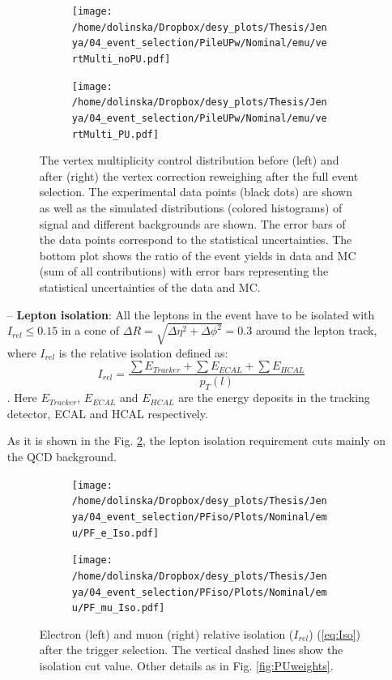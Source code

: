 \begin{itemize}
 \begin{figure}[h]
 \centering
 \begin{subfigure}
   \centering
   \texttt{[image: /home/dolinska/Dropbox/desy\_plots/Thesis/Jenya/04\_event\_selection/PileUPw/Nominal/emu/vertMulti\_noPU.pdf]}
 \end{subfigure}
 \begin{subfigure}
   \centering
   \texttt{[image: /home/dolinska/Dropbox/desy\_plots/Thesis/Jenya/04\_event\_selection/PileUPw/Nominal/emu/vertMulti\_PU.pdf]}
 \end{subfigure}
 \caption{The vertex multiplicity control distribution before (left) and after (right) the vertex correction reweighing after the full event selection.
  The experimental data points (black dots) are shown as well as the simulated distributions (colored histograms) of signal and different backgrounds 
  are shown. The error bars of the data points correspond to the statistical uncertainties. The bottom plot shows the ratio of the event yields in data 
  and MC (sum of all contributions) with error bars representing the statistical uncertainties of the data and MC.}
 \label{fig:PUweight}
 \end{figure}
 
 \item [--] \textbf{Lepton isolation}: All the leptons in the event have to be isolated with $I_{rel}\leq 0.15$ in a cone of $\Delta R = \sqrt{\Delta\eta^{2} + \Delta\phi^{2}} = 0.3$ 
 around the lepton track, where $I_{rel}$ is the relative isolation defined as:
  \begin{equation}\label{eq:Iso}
   I_{rel} = \frac{\sum E_{Tracker} + \sum E_{ECAL} + \sum E_{HCAL}}{p_{T}(l)}
  \end{equation}.
 Here $E_{Tracker}$, $E_{ECAL}$ and $E_{HCAL}$ are the energy deposits in the tracking detector, ECAL and HCAL respectively.
 
 As it is shown in the Fig. \ref{fig:PFIso}, the lepton isolation requirement cuts mainly on the QCD background.

 \begin{figure}[h]
 \centering
 \begin{subfigure}
   \centering
   \texttt{[image: /home/dolinska/Dropbox/desy\_plots/Thesis/Jenya/04\_event\_selection/PFiso/Plots/Nominal/emu/PF\_e\_Iso.pdf]}
 \end{subfigure}
 \begin{subfigure}
   \centering
   \texttt{[image: /home/dolinska/Dropbox/desy\_plots/Thesis/Jenya/04\_event\_selection/PFiso/Plots/Nominal/emu/PF\_mu\_Iso.pdf]}
 \end{subfigure}
 \caption{Electron (left) and muon (right) relative isolation ($I_{rel}$) (\ref{eq:Iso}) after the trigger selection. The vertical dashed lines 
  show the isolation cut value. Other details as in Fig. \ref{fig:PUweights}.}
 \label{fig:PFIso}
 \end{figure}
 

\end{itemize}
